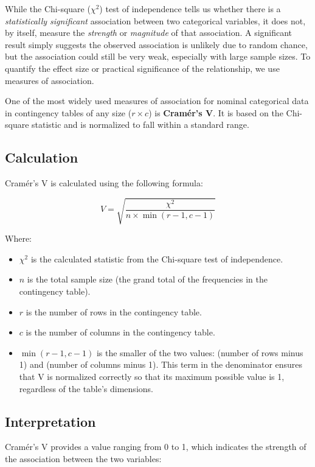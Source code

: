 \documentclass{article}
\begin{document}
While the Chi-square ($\chi^2$) test of independence tells us whether there is a \emph{statistically significant} association between two categorical variables, it does not, by itself, measure the \emph{strength} or \emph{magnitude} of that association. A significant result simply suggests the observed association is unlikely due to random chance, but the association could still be very weak, especially with large sample sizes. To quantify the effect size or practical significance of the relationship, we use measures of association.

One of the most widely used measures of association for nominal categorical data in contingency tables of any size ($r \times c$) is \textbf{Cramér's V}. It is based on the Chi-square statistic and is normalized to fall within a standard range.

\subsection{Calculation}

Cramér's V is calculated using the following formula:

$$ V = \sqrt{\frac{\chi^2}{n \times \min(r-1, c-1)}} $$

Where:
\begin{itemize}
    \item $\chi^2$ is the calculated statistic from the Chi-square test of independence.
    \item $n$ is the total sample size (the grand total of the frequencies in the contingency table).
    \item $r$ is the number of rows in the contingency table.
    \item $c$ is the number of columns in the contingency table.
    \item $\min(r-1, c-1)$ is the smaller of the two values: (number of rows minus 1) and (number of columns minus 1). This term in the denominator ensures that V is normalized correctly so that its maximum possible value is 1, regardless of the table's dimensions.
\end{itemize}

\subsection{Interpretation}

Cramér's V provides a value ranging from 0 to 1, which indicates the strength of the association between the two variables:
\end{document}
